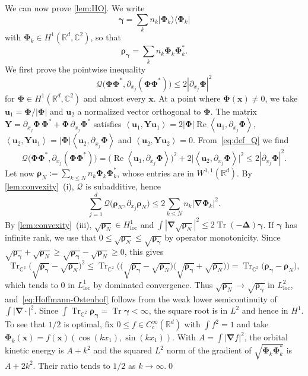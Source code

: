 \documentclass[final,reqno]{amsart}
\theoremstyle{remark}
\renewcommand{\le}{\leqslant}
\renewcommand{\ge}{\geqslant}
\DeclareMathOperator{\Real}{Re}
\DeclareMathOperator{\Tr}{Tr}
\newcommand{\Trs}{\Tr_{\CC^2}}
\newcommand{\RR}{\mathbb{R}}
\newcommand{\CC}{\mathbb{C}}
\newcommand{\pscal}[1]{\left\langle #1 \right\rangle}
\newcommand{\lapl}{\bm{\Delta}}
\newcommand{\grad}{\bm{\nabla}}
\newcommand{\QC}{\mathcal{Q}}
\begin{document}
We can now prove \cref{lem:HO}. We write
$$
\bm{\gamma}=\sum_kn_k|\bm{\Phi}_k\rangle\langle\bm{\Phi}_k|
$$
with $\bm{\Phi}_k\in H^1(\RR^d,\CC^2)$, so that
$$
\bm{\rho}_{\bm{\gamma}}=\sum_kn_k\bm{\Phi}_k\bm{\Phi}_k^*.
$$
We first prove the pointwise inequality
$$
\QC\big(\bm{\Phi}\bm{\Phi}^*,\partial_{x_j}(\bm{\Phi}\bm{\Phi}^*)\big)\le 2|\partial_{x_j}\bm{\Phi}|^2
$$
for $\bm{\Phi}\in H^1(\RR^d,\CC^2)$ and almost every $\mathbf{x}$. At a point where $\bm{\Phi}(\mathbf{x})\neq0$, we take $\mathbf{u}_1=\bm{\Phi}/|\bm{\Phi}|$ and $\mathbf{u}_2$ a normalized vector orthogonal to $\bm{\Phi}$. The matrix $\mathbf{Y}=\partial_{x_j}\bm{\Phi}\,\bm{\Phi}^*+\bm{\Phi}\,\partial_{x_j}\bm{\Phi}^*$ satisfies $\pscal{\mathbf{u}_1,\mathbf{Y}\mathbf{u}_1}=2|\bm{\Phi}|\Real\pscal{\mathbf{u}_1,\partial_{x_j}\bm{\Phi}}$, $\pscal{\mathbf{u}_2,\mathbf{Y}\mathbf{u}_1}=|\bm{\Phi}|\pscal{\mathbf{u}_2,\partial_{x_j}\bm{\Phi}}$ and $\pscal{\mathbf{u}_2,\mathbf{Y}\mathbf{u}_2}=0$. From~\cref{eq:def_Q} we find
$$
\QC\big(\bm{\Phi}\bm{\Phi}^*,\partial_{x_j}(\bm{\Phi}\bm{\Phi}^*)\big)=\big(\Real\pscal{\mathbf{u}_1,\partial_{x_j}\bm{\Phi}}\big)^2+2\big|\pscal{\mathbf{u}_2,\partial_{x_j}\bm{\Phi}}\big|^2\le 2|\partial_{x_j}\bm{\Phi}|^2.
$$
Let now $\bm{\rho}_N:=\sum_{k\le N}n_k\bm{\Phi}_k\bm{\Phi}_k^*$, whose entries are in $W^{1,1}(\RR^d)$. By \cref{lem:convexity}~(i), $\QC$ is subadditive, hence
$$
\sum_{j=1}^d\QC\big(\bm{\rho}_N,\partial_{x_j}\bm{\rho}_N\big)\le2\sum_{k\le N}n_k|\grad\bm{\Phi}_k|^2.
$$
By \cref{lem:convexity}~(iii), $\sqrt{\bm{\rho}_N}\in H^1_{\mathrm{loc}}$ and $\int|\grad\sqrt{\bm{\rho}_N}|^2\le2\Tr(-\lapl)\bm{\gamma}$. If $\bm{\gamma}$ has infinite rank, we use that $0\le\sqrt{\bm{\rho}_N}\le\sqrt{\bm{\rho}_{\bm{\gamma}}}$ by operator monotonicity. Since $\sqrt{\bm{\rho}_{\bm{\gamma}}}+\sqrt{\bm{\rho}_N}\ge\sqrt{\bm{\rho}_{\bm{\gamma}}}-\sqrt{\bm{\rho}_N}\ge0$, this gives
$$
\Trs\big(\sqrt{\bm{\rho}_{\bm{\gamma}}}-\sqrt{\bm{\rho}_N}\big)^2\le\Trs\Big(\big(\sqrt{\bm{\rho}_{\bm{\gamma}}}-\sqrt{\bm{\rho}_N}\big)\big(\sqrt{\bm{\rho}_{\bm{\gamma}}}+\sqrt{\bm{\rho}_N}\big)\Big)=\Trs\big(\bm{\rho}_{\bm{\gamma}}-\bm{\rho}_N\big),
$$
which tends to $0$ in $L^1_{\mathrm{loc}}$ by dominated convergence. Thus $\sqrt{\bm{\rho}_N}\to\sqrt{\bm{\rho}_{\bm{\gamma}}}$ in $L^2_{\mathrm{loc}}$, and~\cref{eq:Hoffmann-Ostenhof} follows from the weak lower semicontinuity of $\int|\grad\cdot|^2$. Since $\int\Trs\bm{\rho}_{\bm{\gamma}}=\Tr\bm{\gamma}<\infty$, the square root is in $L^2$ and hence in $H^1$. To see that $1/2$ is optimal, fix $0\le f\in C_c^\infty(\RR^d)$ with $\int f^2=1$ and take $\bm{\Phi}_k(\mathbf{x})=f(\mathbf{x})(\cos(kx_1),\sin(kx_1))$. With $A=\int|\grad f|^2$, the orbital kinetic energy is $A+k^2$ and the squared $L^2$ norm of the gradient of $\sqrt{\bm{\Phi}_k\bm{\Phi}_k^*}$ is $A+2k^2$. Their ratio tends to $1/2$ as $k\to\infty$.\qed
\end{document}
